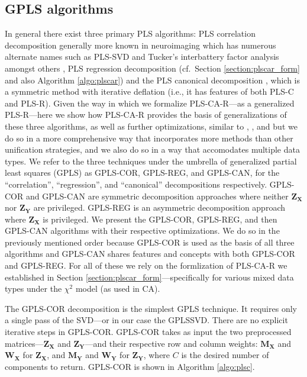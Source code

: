 \documentclass[12pt]{article}
\begin{document}
\hypertarget{gpls-algorithms}{%
\subsection{GPLS algorithms}\label{gpls-algorithms}}

In general there exist three primary PLS algorithms: PLS correlation
decomposition \citep{bookstein1994partial, ketterlinus1989partial}
generally more known in neuroimaging
\citep{mcintosh_spatial_1996, mcintosh_partial_2004, krishnan_partial_2011}
which has numerous alternate names such as PLS-SVD and Tucker's
interbattery factor analysis \citep{tucker_inter-battery_1958} amongst
others \citep[see also][]{beaton_partial_2016}, PLS regression
decomposition (cf.~Section \ref{section:plscar_form} and also Algorithm
\ref{algo:plscar}) and the PLS canonical decomposition
\citep{tenenhaus_regression_1998, wegelin2000survey}, which is a
symmetric method with iterative deflation (i.e., it has features of both
PLS-C and PLS-R). Given the way in which we formalize PLS-CA-R---as a
generalized PLS-R---here we show how PLS-CA-R provides the basis of
generalizations of these three algorithms, as well as further
optimizations, similar to \citet{borga_unified_1992},
\citet{indahl2009canonical}, and \citet{de2019pls} but we do so in a
more comprehensive way that incorporates more methods than other
unification strategies, and we also do so in a way that accomodates
multiple data types. We refer to the three techniques under the umbrella
of generalized partial least squares (GPLS) as GPLS-COR, GPLS-REG, and
GPLS-CAN, for the ``correlation'', ``regression'', and ``canonical''
decompositions respectively. GPLS-COR and GPLS-CAN are symmetric
decomposition approaches where neither \({\mathbf Z}_{{\mathbf X}}\) nor
\({\mathbf Z}_{{\mathbf Y}}\) are privileged. GPLS-REG is an asymmetric
decomposition approach where \({\mathbf Z}_{{\mathbf X}}\) is
privileged. We present the GPLS-COR, GPLS-REG, and then GPLS-CAN
algorithms with their respective optimizations. We do so in the
previously mentioned order because GPLS-COR is used as the basis of all
three algorithms and GPLS-CAN shares features and concepts with both
GPLS-COR and GPLS-REG. For all of these we rely on the formlization of
PLS-CA-R we established in Section
\ref{section:plscar_form}---specifically for various mixed data types
under the \(\chi^2\) model (as used in CA).

The GPLS-COR decomposition is the simplest GPLS technique. It requires
only a single pass of the SVD---or in our case the GPLSSVD. There are no
explicit iterative steps in GPLS-COR. GPLS-COR takes as input the two
preprocessed matrices---\({\mathbf Z}_{\mathbf X}\) and
\({\mathbf Z}_{\mathbf Y}\)---and their respective row and column
weights: \({\mathbf M}_{\mathbf X}\) and \({\mathbf W}_{\mathbf X}\) for
\({\mathbf Z}_{\mathbf X}\), and \({\mathbf M}_{\mathbf Y}\) and
\({\mathbf W}_{\mathbf Y}\) for \({\mathbf Z}_{\mathbf Y}\), where \(C\)
is the desired number of components to return. GPLS-COR is shown in
Algorithm \ref{algo:plsc}.
\end{document}
